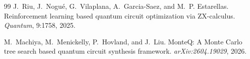 \documentclass[UTF8,fontset=macnew,11pt]{ctexart}
\begin{document}
\begin{thebibliography}{99}
J.~Riu, J.~Nogu{\'e}, G.~Vilaplana, A.~Garcia-Saez, and M.~P. Estarellas.
\newblock Reinforcement learning based quantum circuit optimization via ZX-calculus.
\newblock \emph{Quantum}, 9:1758, 2025.

M.~Machiya, M.~Menickelly, P.~Hovland, and J.~Liu.
\newblock MonteQ: A Monte Carlo tree search based quantum circuit synthesis framework.
\newblock \emph{arXiv:2604.19029}, 2026.

\end{thebibliography}
\end{document}
